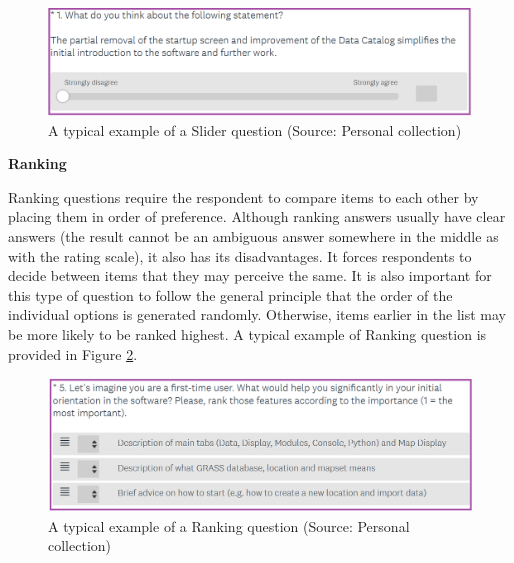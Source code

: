 \documentclass[a4paper,10pt,twoside]{article}
\begin{document}
\vspace{0.3cm}
\begin{figure}[hbt!] 
\begin{center}
\includegraphics[width=16cm]{../pictures/slider_question.png} 
\caption[A typical example of a Slider question]{A typical example of a Slider question (Source: Personal collection)}
\label{fig:slider_question}
\end{center}
\end{figure}


\smallskip
\vspace*{-0.5cm}
\noindent \textbf {Ranking}

\noindent Ranking questions require the respondent to compare items to each other by placing them in order of preference. Although ranking answers usually have clear answers (the result cannot be an ambiguous answer somewhere in the middle as with the rating scale), it also has its disadvantages. It forces respondents to decide between items that they may perceive the same. It is also important for this type of question to follow the general principle that the order of the individual options is generated randomly. Otherwise, items earlier in the list may be more likely to be ranked highest. A typical example of Ranking question is provided in Figure \ref{fig:ranking_question}.

\vspace{0.3cm}
\begin{figure}[hbt!] 
\begin{center}
\includegraphics[width=16cm]{../pictures/ranking_question.png} 
\caption[A typical example of a Ranking question]{A typical example of a Ranking question (Source: Personal collection)}
\label{fig:ranking_question}
\end{center}
\end{figure}
\end{document}
